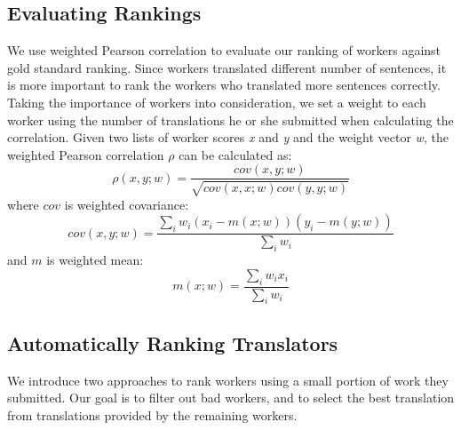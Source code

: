 \subsection{Evaluating Rankings}
We use weighted Pearson correlation \cite{pozzi2012exponential} to evaluate our ranking of workers against gold standard ranking. Since workers translated different number of sentences, it is more important to rank the workers who translated more sentences correctly. Taking the importance of workers into consideration, we set a weight to each worker using the number of translations he or she submitted when calculating the correlation.
Given two lists of worker scores \textit{x} and \textit{y} and the weight vector \textit{w}, the weighted Pearson correlation $\rho$ can be calculated as:
\begin{equation}
\rho(x,y;w) = \frac{cov(x,y;w)}{\sqrt{cov(x,x;w)cov(y,y;w)}}
\end{equation}
where $cov$ is weighted covariance:
\begin{equation}
cov(x,y;w)  = \frac{\sum_i w_i (x_i - m(x;w))(y_i - m(y;w))}{\sum_i w_i}
\end{equation}
and $m$ is weighted mean:
\begin{equation} 
m(x;w)  =  \frac{\sum_{i} w_i x_i}{\sum_i w_i} 
\end{equation}

\subsection{Automatically Ranking Translators}

We introduce two approaches to rank workers using a small portion of work they submitted.  Our goal is to filter out bad workers, and to select the best translation from translations provided by the remaining workers.




